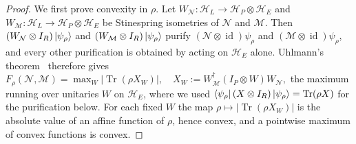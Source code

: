 \documentclass[10pt,twocolumn,superscriptaddress,aps,amsmath,amssymb,citeautoscript,floatfix,prx]{revtex4-2}
\theoremstyle{plain}
\theoremstyle{plain}
\theoremstyle{plain}
\theoremstyle{plain}
\theoremstyle{plain}
\theoremstyle{plain}
\theoremstyle{plain}
\theoremstyle{definition}
\theoremstyle{plain}
\begin{document}
\begin{appendix}
\begin{proof}
    We first prove convexity in $\rho$. Let $W_{\mathcal N}:\mathcal H_L\to\mathcal H_P\otimes\mathcal H_E$ and $W_{\mathcal M}:\mathcal H_L\to\mathcal H_P\otimes\mathcal H_E$ be Stinespring isometries of $\mathcal N$ and $\mathcal M$. Then $(W_{\mathcal N}\otimes I_R)\ket{\psi_\rho}$ and $(W_{\mathcal M}\otimes I_R)\ket{\psi_\rho}$ purify $(\mathcal N\otimes\operatorname{id})\psi_\rho$ and $(\mathcal M\otimes\operatorname{id})\psi_\rho$, and every other purification is obtained by acting on $\mathcal H_E$ alone. Uhlmann's theorem~\cite{KretschmannSchlingemannWerner2008} therefore gives
    $
        F_\rho(\mathcal N,\mathcal M)=\max_W\left|\operatorname{Tr}\left(\rho X_W\right)\right|,
        \quad
        X_W:=W_{\mathcal M}^\dagger\left(I_P\otimes W\right)W_{\mathcal N},
    $
    the maximum running over unitaries $W$ on $\mathcal H_E$, where we used $\bra{\psi_\rho}(X\otimes I_R)\ket{\psi_\rho}=\operatorname{Tr}(\rho X)$ for the purification below. 
    For each fixed $W$ the map $\rho\mapsto\left|\operatorname{Tr}(\rho X_W)\right|$ is the absolute value of an affine function of $\rho$, hence convex, and a pointwise maximum of convex functions is convex. 
    

\end{proof}
\end{appendix}
\end{document}
